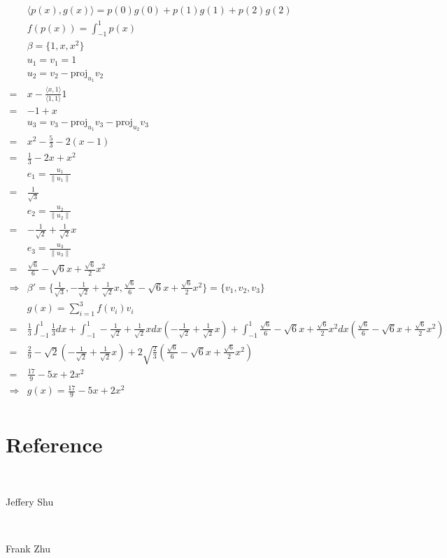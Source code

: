 \documentclass{article}
\def\proj{\text{proj}}
\begin{document}
\begin{equation*}
    \begin{split}
        &\langle p(x),g(x)\rangle=p(0)g(0)+p(1)g(1)+p(2)g(2)\\
        &f(p(x))=\int^1_{-1}p(x)\\
        &\beta=\{1,x,x^2\}\\
        &u_1=v_1=1\\
        &u_2=v_2-\proj_{u_1}v_2\\
        =&x-\frac{\langle x,1\rangle}{\langle1,1\rangle}1\\
        =&-1+x\\
        &u_3=v_3-\proj_{u_1}v_3-\proj_{u_2}v_3\\
        =&x^2-\frac{5}{3}-2(x-1)\\
        =&\frac{1}{3}-2x+x^2\\
        &e_1=\frac{u_1}{\|u_1\|}\\
        =&\frac{1}{\sqrt{3}}\\
        &e_2=\frac{u_2}{\|u_2\|}\\
        =&-\frac{1}{\sqrt{2}}+\frac{1}{\sqrt{2}}x\\
        &e_3=\frac{u_3}{\|u_3\|}\\
        =&\frac{\sqrt{6}}{6}-\sqrt{6}x+\frac{\sqrt{6}}{2}x^2\\
        \Rightarrow&\beta'=\{\frac{1}{\sqrt{3}},-\frac{1}{\sqrt{2}}+\frac{1}{\sqrt{2}}x,\frac{\sqrt{6}}{6}-\sqrt{6}x+\frac{\sqrt{6}}{2}x^2\}=\{v_1,v_2,v_3\}\\
        &g(x)=\sum^3_{i=1}f(v_i)v_i\\
        =&\frac{1}{3}\int_{-1}^{1}\frac{1}{3}dx+\int_{-1}^{1}-\frac{1}{\sqrt{2}}+\frac{1}{\sqrt{2}}xdx(-\frac{1}{\sqrt{2}}+\frac{1}{\sqrt{2}}x)+\int_{-1}^{1}\frac{\sqrt{6}}{6}-\sqrt{6}x+\frac{\sqrt{6}}{2}x^2dx(\frac{\sqrt{6}}{6}-\sqrt{6}x+\frac{\sqrt{6}}{2}x^2)\\
        =&\frac{2}{9}-\sqrt{2}(-\frac{1}{\sqrt{2}}+\frac{1}{\sqrt{2}}x)+2\sqrt{\frac{2}{3}}(\frac{\sqrt{6}}{6}-\sqrt{6}x+\frac{\sqrt{6}}{2}x^2)\\
        =&\frac{17}{9}-5x+2x^2\\
        \Rightarrow&g(x)=\frac{17}{9}-5x+2x^2\\
    \end{split}
\end{equation*}

\newpage

\section{Reference}

~

Jeffery Shu

~

Frank Zhu
\end{document}
